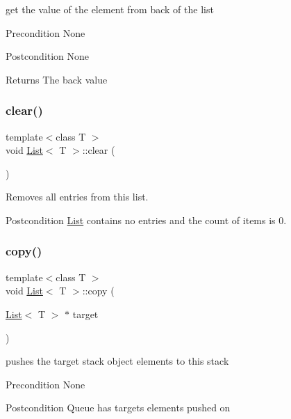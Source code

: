 get the value of the element from back of the list \begin{DoxyPrecond}{Precondition}
None 
\end{DoxyPrecond}
\begin{DoxyPostcond}{Postcondition}
None 
\end{DoxyPostcond}
\begin{DoxyReturn}{Returns}
The back value 
\end{DoxyReturn}
\mbox{\label{class_list_ae296516a252e11963dbf963727ce429a}} 
\subsubsection{\texorpdfstring{clear()}{clear()}}
{\footnotesize\ttfamily template$<$class T $>$ \\
void \hyperlink{class_list}{List}$<$ T $>$\+::clear (\begin{DoxyParamCaption}{ }\end{DoxyParamCaption})}

Removes all entries from this list. \begin{DoxyPostcond}{Postcondition}
\hyperlink{class_list}{List} contains no entries and the count of items is 0. 
\end{DoxyPostcond}
\mbox{\label{class_list_ac6c3b0e253ce3c9b90053b95769f12a9}} 
\subsubsection{\texorpdfstring{copy()}{copy()}}
{\footnotesize\ttfamily template$<$class T $>$ \\
void \hyperlink{class_list}{List}$<$ T $>$\+::copy (\begin{DoxyParamCaption}\item[{\hyperlink{class_list}{List}$<$ T $>$ $\ast$}]{target }\end{DoxyParamCaption})}

pushes the target stack object elements to this stack \begin{DoxyPrecond}{Precondition}
None 
\end{DoxyPrecond}
\begin{DoxyPostcond}{Postcondition}
Queue has target\textquotesingle{}s elements pushed on 
\end{DoxyPostcond}

